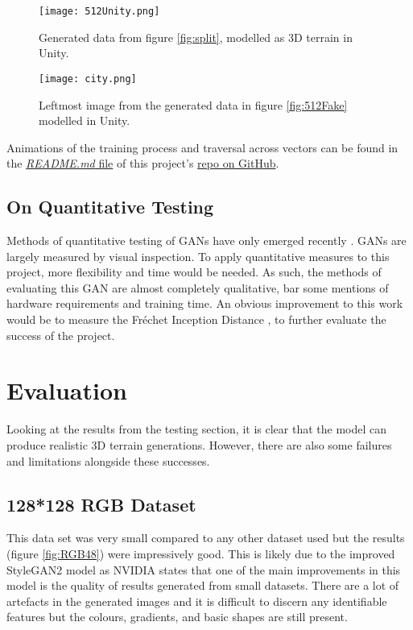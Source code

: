 \documentclass[a4paper]{report}
\begin{document}
\begin{figure}[H]
    \centering
        \texttt{[image: 512Unity.png]}
        \caption{Generated data from figure \ref{fig:split}, modelled as 3D terrain in Unity.}
        \label{fig:512Mountains}
\end{figure}

\begin{figure}[H]
    \centering
        \texttt{[image: city.png]}
        \caption{Leftmost image from the generated data in figure \ref{fig:512Fake} modelled in Unity.}
        \label{fig:512City}
\end{figure}

Animations of the training process and traversal across vectors can be found in the \href{https://github.com/hulleylm/landgan}{\textit{README.md} file} of this project's \href{https://github.com/hulleylm/landgan}{repo on GitHub}.

\subsection{On Quantitative Testing}
Methods of quantitative testing of GANs have only emerged recently \cite{howgood}. GANs are largely measured by visual inspection. To apply quantitative measures to this project, more flexibility and time would be needed. As such, the methods of evaluating this GAN are almost completely qualitative, bar some mentions of hardware requirements and training time. An obvious improvement to this work would be to measure the Fréchet Inception Distance \cite{FID}, to further evaluate the success of the project.

\section{Evaluation}
Looking at the results from the testing section, it is clear that the model can produce realistic 3D terrain generations. However, there are also some failures and limitations alongside these successes.

\subsection{128*128 RGB Dataset}
This data set was very small compared to any other dataset used but the results (figure \ref{fig:RGB48}) were impressively good. This is likely due to the improved StyleGAN2 model as NVIDIA states that one of the main improvements in this model is the quality of results generated from small datasets. There are a lot of artefacts in the generated images and it is difficult to discern any identifiable features but the colours, gradients, and basic shapes are still present.
\end{document}
